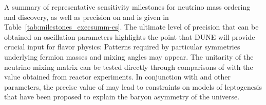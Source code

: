 A summary of representative sensitivity milestones for neutrino 
mass ordering and  discovery, as well as precision on 
\deltacp and  is given in 
Table~\ref{tab:milestones_execsumm-es}.  The ultimate level of 
precision that can be obtained on oscillation parameters 
highlights the point that DUNE will provide crucial input for  
flavor physics:  Patterns required by particular symmetries 
underlying fermion masses and mixing angles may appear.  The 
unitarity of the neutrino mixing matrix can be tested directly 
through comparisons of  with the value obtained from 
reactor experiments.  In conjunction with  and 
other parameters, the precise value of \deltacp may lead to 
constraints on models of leptogenesis that have been proposed 
to explain the baryon asymmetry of the universe.

